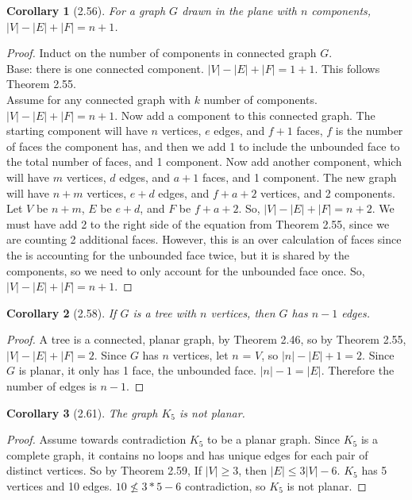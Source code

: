\documentclass{article}
\newtheorem*{cor}{Corollary}
\begin{document}
\begin{cor}[2.56]
	For a graph $G$ drawn in the plane with $n$ components, $|V| - |E| + |F| = n + 1$.
\end{cor}
\begin{proof}
	Induct on the number of components in connected graph $G$. \\ Base: there is one connected component. $|V| - |E| + |F| = 1 + 1$. This follows Theorem 2.55.\\ Assume for any connected graph with $k$ number of components.
	$|V| - |E| + |F| = n + 1$. 
	Now add a component to this connected graph. The starting component will have $n$ vertices, $e$ edges, and $f + 1$ faces, $f$ is the number of faces the component has, and then we add 1 to include the unbounded face to 
	the total number of faces, and 1 component. Now add another component, which will have $m$ vertices, $d$ edges, and $a + 1$ faces, and 1 component. The new graph will have $n + m$ vertices, $e + d$ edges, 
	and $f + a + 2$ vertices, and 2 components. Let $V$ be $n + m$, $E$ be $e + d$, and $F$ be $f + a + 2$. So, $|V| - |E| + |F| = n + 2$. We must have add 2 to the right side of the equation from Theorem 2.55, since we are
	counting 2 additional faces. However, this is an over calculation of faces since the is accounting for the unbounded face twice, but it is shared by the components, so we need to only account for the unbounded face once. So,
	$|V| - |E| + |F| = n + 1$.
\end{proof}

\begin{cor}[2.58]
	If $G$ is a tree with $n$ vertices, then $G$ has $n - 1$ edges.
\end{cor}
\begin{proof}
	A tree is a connected, planar graph, by Theorem 2.46, so by Theorem 2.55, $|V| - |E| + |F| = 2$. Since $G$ has $n$ vertices, let $n$ = $V$, so
	$|n| - |E| + 1 = 2$. Since $G$ is planar, it only has 1 face, the unbounded face. $|n| - 1 = |E|$. Therefore the number of edges is $n - 1$.
\end{proof}

\begin{cor}[2.61]
	The graph $K_5$ is not planar.
\end{cor}
\begin{proof}
	Assume towards contradiction $K_5$ to be a planar graph. Since $K_5$ is a complete graph, it contains no loops and has unique edges for each pair of distinct vertices. So by Theorem 2.59, If $|V| \geq 3$, then $|E| \leq 3|V| - 6.$
	$K_5$ has 5 vertices and 10 edges. $10 \nleq 3*5 - 6$ contradiction, so $K_5$ is not planar. 
\end{proof}
\end{document}

